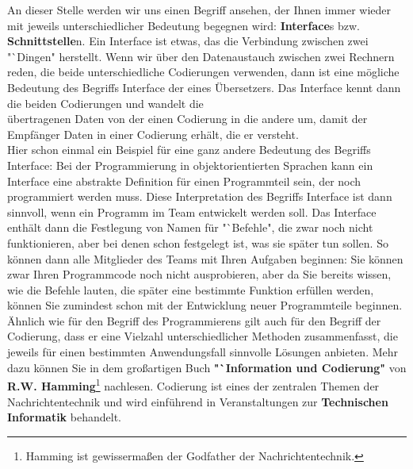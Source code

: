 An dieser Stelle werden wir uns einen Begriff ansehen, der Ihnen immer wieder mit jeweils unterschiedlicher Bedeutung begegnen wird: \textbf{Interface}s bzw. \textbf{Schnittstelle}n. Ein Interface ist etwas, das die Verbindung zwischen zwei "`Dingen" herstellt. Wenn wir über den Datenaustauch zwischen zwei Rechnern reden, die beide unterschiedliche Codierungen verwenden, dann ist eine mögliche Bedeutung des Begriffs Interface der eines Übersetzers. Das Interface kennt dann die beiden Codierungen und wandelt die\\ übertragenen Daten von der einen Codierung in die andere um, damit der Empfänger Daten in einer Codierung erhält, die er versteht.\\

Hier schon einmal ein Beispiel für eine ganz andere Bedeutung des Begriffs Interface: Bei der Programmierung in objektorientierten Sprachen kann ein Interface eine abstrakte Definition für einen Programmteil sein, der noch programmiert werden muss. Diese Interpretation des Begriffs Interface ist dann sinnvoll, wenn ein Programm im Team entwickelt werden soll. Das Interface enthält dann die Festlegung von Namen für "`Befehle", die zwar noch nicht funktionieren, aber bei denen schon festgelegt ist, was sie später tun sollen. So können dann alle Mitglieder des Teams mit Ihren Aufgaben beginnen: Sie können zwar Ihren Programmcode noch nicht ausprobieren, aber da Sie bereits wissen, wie die Befehle lauten, die später eine bestimmte Funktion erfüllen werden, können Sie zumindest schon mit der Entwicklung neuer Programmteile beginnen.\\ 

Ähnlich wie für den Begriff des Programmierens gilt auch für den Begriff der Codierung, dass er eine Vielzahl unterschiedlicher Methoden zusammenfasst, die jeweils für einen bestimmten Anwendungsfall sinnvolle Lösungen anbieten. Mehr dazu können Sie in dem großartigen Buch \textbf{"`Information und Codierung"} von \textbf{R.W. Hamming}\footnote{Hamming ist gewissermaßen der Godfather der Nachrichtentechnik.}  nachlesen. Codierung ist eines der zentralen Themen der Nachrichtentechnik und wird einführend in Veranstaltungen zur \textbf{Technischen Informatik} behandelt.\\

